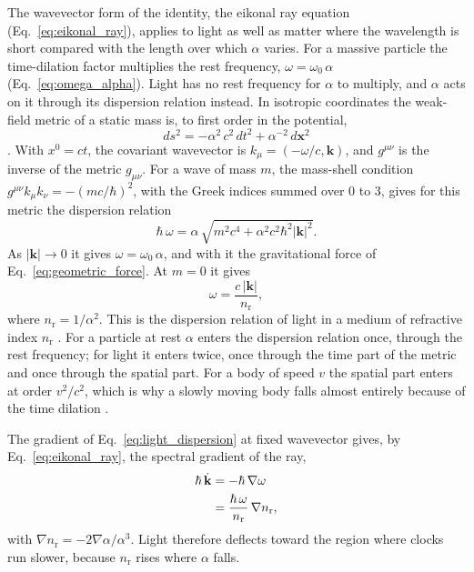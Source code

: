 \documentclass[aps,prd,onecolumn,tightenlines,nofootinbib,notitlepage,11pt,floatfix]{revtex4-2}
\theoremstyle{indentedtheorem}
\begin{document}
The wavevector form of the identity, the eikonal ray equation (Eq.~\eqref{eq:eikonal_ray}), applies to light as well as matter where the wavelength is short compared with the length over which $\alpha$ varies. For a massive particle the time-dilation factor multiplies the rest frequency, $\omega=\omega_0\,\alpha$ (Eq.~\eqref{eq:omega_alpha}). Light has no rest frequency for $\alpha$ to multiply, and $\alpha$ acts on it through its dispersion relation instead. In isotropic coordinates the weak-field metric of a static mass is, to first order in the potential,
\begin{equation}
    ds^2 = -\alpha^2 \, c^2\,dt^2 + \alpha^{-2}\,d\mathbf{x}^2
    \label{eq:isotropic}
\end{equation}
\citep{MTW1973Gravitation}. With $x^0=ct$, the covariant wavevector is $k_\mu=(-\omega/c,\mathbf{k})$, and $g^{\mu\nu}$ is the inverse of the metric $g_{\mu\nu}$. For a wave of mass $m$, the mass-shell condition $g^{\mu\nu}k_\mu k_\nu=-(mc/\hbar)^2$, with the Greek indices summed over $0$ to $3$, gives for this metric the dispersion relation
\begin{equation}
    \hbar\,\omega = \alpha\,\sqrt{m^2c^4+\alpha^2c^2\hbar^2|\mathbf{k}|^2} .
    \label{eq:isotropic_dispersion}
\end{equation}
As $|\mathbf{k}|\to0$ it gives $\omega=\omega_0\,\alpha$, and with it the gravitational force of Eq.~\eqref{eq:geometric_force}. At $m=0$ it gives
\begin{equation}
    \omega = \frac{c\,|\mathbf{k}|}{n_\text{r}} ,
    \label{eq:light_dispersion}
\end{equation}
where $n_\text{r}=1/\alpha^2$. This is the dispersion relation of light in a medium of refractive index $n_\text{r}$ \citep{Eddington1920,Gordon1923Refraction,deFelice1971Gravitational}. For a particle at rest $\alpha$ enters the dispersion relation once, through the rest frequency; for light it enters twice, once through the time part of the metric and once through the spatial part. For a body of speed $v$ the spatial part enters at order $v^2/c^2$, which is why a slowly moving body falls almost entirely because of the time dilation \citep{Gould2016Why}.

The gradient of Eq.~\eqref{eq:light_dispersion} at fixed wavevector gives, by Eq.~\eqref{eq:eikonal_ray}, the spectral gradient of the ray,
\begin{align}
    \hbar\,\dot{\mathbf{k}} &= -\hbar\,\nabla\omega \notag\\
    &= \frac{\hbar \, \omega}{n_\text{r}}\,\nabla n_\text{r} ,
    \label{eq:light_gradient}
\end{align}
with $\nabla n_\text{r}=-2\nabla\alpha/\alpha^3$. Light therefore deflects toward the region where clocks run slower, because $n_\text{r}$ rises where $\alpha$ falls.
\end{document}
